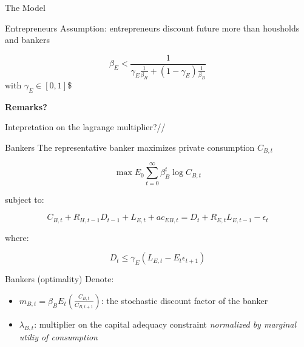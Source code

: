 \documentclass[
  ignorenonframetext,
]{beamer}
\providecommand{\tightlist}{%
  \setlength{\itemsep}{0pt}\setlength{\parskip}{0pt}}\usepackage{longtable,booktabs,array}
\begin{document}
\begin{frame}{The Model}
\begin{block}{Entrepreneurs}
Assumption: entrepreneurs discount future more than housholds and
bankers

\[\beta_E < \frac{1}{\gamma_E \frac{1}{\beta_H} + (1-\gamma_E)\frac{1}{\beta_B}}\]
with \(\gamma_E\in[0,1]\)\$

\textbf{Remarks?}
\end{block}

\begin{block}{Intepretation on the lagrange multiplier?//}
\label{intepretation-on-the-lagrange-multiplier}
\end{block}

\begin{block}{Bankers}
\label{bankers}
The representative banker maximizes private consumption \(C_{B,t}\)

\[\max E_0 \sum_{t=0}^{\infty} \beta^t_B \log C_{B,t}\]

subject to:

\[C_{B,t} + R_{H,t-1} D_{t-1} + L_{E,t} + a c_{EB,t} = D_t + R_{E,t} L_{E,t-1} - \epsilon_t\]

where:


\[D_t \leq \gamma_E \left( L_{E,t} - E_t \epsilon_{t+1} \right)\]
\end{block}

\begin{block}{Bankers (optimality)}
\label{bankers-optimality}
Denote:

\begin{itemize}
\tightlist
\item
  \(m_{B,t} = \beta_B E_t \left( \frac{C_{B,t}}{C_{B,t+1}}\right)\): the
  stochastic discount factor of the banker
\item
  \(\lambda_{B,t}\): multiplier on the capital adequacy constraint
  \emph{normalized by marginal utiliy of consumption}
\end{itemize}


\end{block}
\end{frame}
\end{document}
